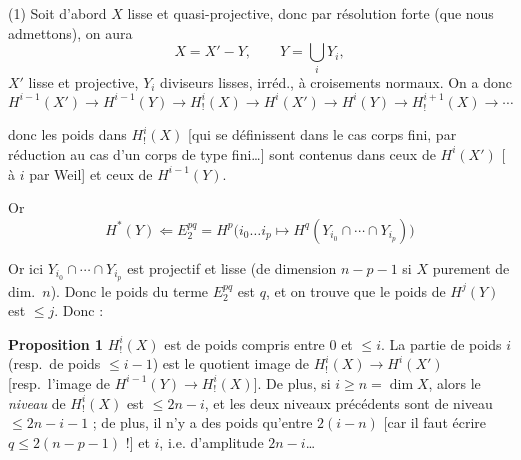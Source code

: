 \documentclass[11pt,a4paper]{article}
\begin{document}
(1) Soit d'abord $X$ lisse et quasi-projective, donc par résolution forte (que
nous admettons), on aura
\[
X = X' - Y, \qquad Y = \bigcup_{i} Y_{i},
\]
$X'$ lisse et projective, $Y_{i}$ diviseurs lisses, irréd., à
croisements normaux.  On a donc
\[
H^{i-1}(X') \to H^{i-1}(Y) \to H^{i}_{!}(X) \to H^{i}(X') \to H^{i}(Y) \to
H^{i+1}_{!}(X) \to \cdots
\]


\struck{\ill{}} donc les poids dans $H^{i}_{!}(X)$ [qui se définissent
 dans le
cas  corps fini, par réduction au cas d'un corps de type
fini…] sont contenus dans ceux de $H^{i}(X')$ [ à $i$
par Weil] et ceux de $H^{i-1}(Y)$.

Or
\[
H^{*}(Y) \Longleftarrow E_{2}^{pq} = H^{p}\bigl(i_{0} \ldots i_{p} \mapsto
H^{q}(Y_{i_{0}} \cap \cdots \cap Y_{i_{p}})\bigr)
\]

 Or ici $Y_{i_{0}} \cap \cdots \cap Y_{i_{p}}$ est projectif et
lisse (de dimension $n-p-1$ si $X$ \struck{\ill{}} purement de dim.\ $n$).
Donc le poids du terme $E_{2}^{pq}$ est $q$, et on trouve que le poids de
$H^{j}(Y)$ est $\leqslant j$. Donc :

\textbf{Proposition 1}  $H^{i}_{!}(X)$ est de poids compris entre 0
et $\leqslant i$. La partie de poids $i$ (resp.\ de poids $\leqslant i-1$) est
le quotient image de $H^{i}_{!}(X) \to H^{i}(X')$ [resp.\ l'image de
$H^{i-1}(Y) \to H^{i}_{!}(X)$]. De plus, si $i \geqslant n = \dim X$, alors le
\emph{niveau} de $H^{i}_{!}(X)$ est $\leqslant 2n-i$, et les deux niveaux
précédents sont de niveau $\leqslant 2n-i-1$ ; de plus, il n'y a des poids
qu'entre $2(i-n)$ [car il faut écrire $q \leqslant 2(n-p-1)$ !] et $i$, i.e.
\ill{} d'amplitude $2n-i$…
\end{document}
